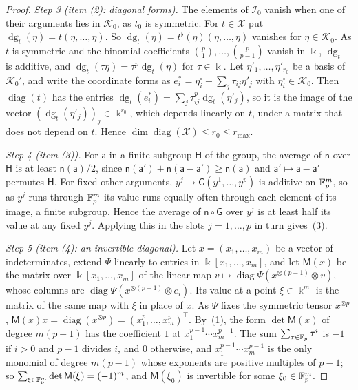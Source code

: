 \begin{proof}
\emph{Step 3 (item (2): diagonal forms).} The elements of $\mathcal I_0$ vanish when one of their arguments lies in
$\mathcal K_0$, as $t_0$ is symmetric. For $t\in\mathcal X$ put $\operatorname{dg}_t(\eta)=t(\eta,\dots,\eta)$. So $\operatorname{dg}_t(\eta)=t^\flat(\eta)(\eta,\dots,\eta)$
vanishes for $\eta\in\mathcal K_0$. As $t$ is symmetric and the binomial coefficients
$\binom p1,\dots,\binom p{p-1}$ vanish in $\Bbbk$, $\operatorname{dg}_t$ is additive, and $\operatorname{dg}_t(\tau\eta)=\tau^p\operatorname{dg}_t(\eta)$ for
$\tau\in\Bbbk$. Let $\eta'_1,\dots,\eta'_{r_0}$ be a basis of $\mathcal K_0'$, and write the coordinate forms as
$e_i^*=\eta_i^\circ+\sum_j\tau_{ij}\eta'_j$ with $\eta_i^\circ\in\mathcal K_0$. Then $\operatorname{diag}(t)$ has the entries
$\operatorname{dg}_t(e_i^*)=\sum_j\tau_{ij}^p\operatorname{dg}_t(\eta'_j)$, so it is the image of the vector $(\operatorname{dg}_t(\eta'_j))_j\in\Bbbk^{r_0}$,
which depends linearly on $t$, under a matrix that does not depend on $t$. Hence
$\dim\operatorname{diag}(\mathcal X)\le r_0\le r_{\max}$.

\emph{Step 4 (item (3)).} For $\mathsf a$ in a finite subgroup $\mathsf H$ of the group, the average of $\mathsf n$ over $\mathsf H$ is at least
$\mathsf n(\mathsf a)/2$, since $\mathsf n(\mathsf a')+\mathsf n(\mathsf a-\mathsf a')\ge\mathsf n(\mathsf a)$ and $\mathsf a'\mapsto\mathsf a-\mathsf a'$ permutes $\mathsf H$. For fixed other arguments,
$y^j\mapsto\mathsf G(y^1,\dots,y^p)$ is additive on $\mathbb F_p^m$, so as $y^j$ runs through $\mathbb F_p^m$ its value runs equally often
through each element of its image, a finite subgroup. Hence the average of $\mathsf n\circ\mathsf G$ over $y^j$ is at least half its
value at any fixed $y^j$. Applying this in the slots $j=1,\dots,p$ in turn gives~(3).

\emph{Step 5 (item (4): an invertible diagonal).} Let $x=(x_1,\dots,x_m)$ be a vector of indeterminates, extend $\Psi$
linearly to entries in $\Bbbk[x_1,\dots,x_m]$, and let $\mathsf M(x)$ be the matrix over $\Bbbk[x_1,\dots,x_m]$ of the
linear map $v\mapsto\operatorname{diag}\Psi(x^{\otimes(p-1)}\otimes v)$, whose columns are
$\operatorname{diag}\Psi(x^{\otimes(p-1)}\otimes e_i)$. Its value at a point $\xi\in\Bbbk^m$ is the matrix of the same
map with $\xi$ in place of $x$. As $\Psi$ fixes the symmetric tensor $x^{\otimes p}$,
$\mathsf M(x)x=\operatorname{diag}(x^{\otimes p})=(x_1^p,\dots,x_m^p)^{\top}$. By~(1), the form
$\det\mathsf M(x)$ of degree $m(p-1)$ has the coefficient $1$ at $x_1^{p-1}\cdots x_m^{p-1}$. The sum
$\sum_{\tau\in\mathbb F_p}\tau^i$ is $-1$ if $i>0$ and $p-1$ divides $i$, and $0$ otherwise, and $x_1^{p-1}\cdots x_m^{p-1}$ is the
only monomial of degree $m(p-1)$ whose exponents are positive multiples of $p-1$; so
$\sum_{\xi\in\mathbb F_p^m}\det\mathsf M(\xi)=(-1)^m$, and $\mathsf M(\xi_0)$ is invertible for some $\xi_0\in\mathbb F_p^m$.


\end{proof}
